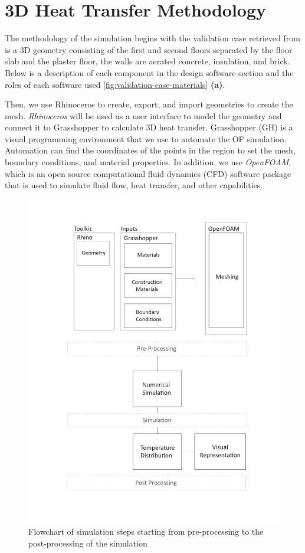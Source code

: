 
\chapter{3D Heat Transfer Methodology}


The methodology of the simulation begins with the validation case retrieved from \cite{ISO} is a 3D geometry consisting of the first and second floors separated by the floor slab and the plaster floor, the walls are aerated concrete, insulation, and brick. 
Below is a description of each component in the design software section and the roles of each software used \ref{fig:validation-case-materials} \textbf{(a)}.

Then, we use Rhinoceros to create, export, and import geometries to create the mesh. 
\textit{Rhinoceros} will be used as a user interface to model the geometry and connect it to Grasshopper to calculate 3D heat transfer.
Grasshopper (GH) is a visual programming environment that we use to automate the OF simulation. Automation can find the coordinates of the points in the region to set the mesh, boundary conditions, and material properties. 
In addition, we use \textit{OpenFOAM}, which is an open source computational fluid dynamics (CFD) software package that is used to simulate fluid flow, heat transfer, and other capabilities. 


   
\begin{figure}[htb]
     \centering
    \includegraphics[trim=2.7cm 1.7cm 2.7cm 1.5cm, clip, width=0.8\linewidth]{Figures/flowchartv.pdf}
     \caption[Simulation Flowchart]{Flowchart of simulation steps starting from pre-processing to the post-processing of the simulation}
   \label{fig:flowchart}
 \end{figure}


